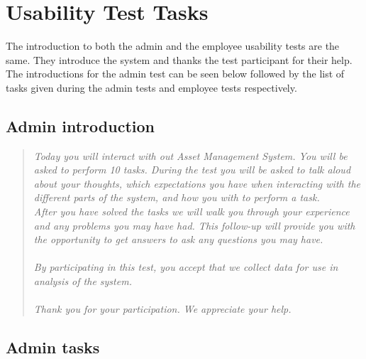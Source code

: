\chapter{Usability Test Tasks} \label{app:usabilityTest}
The introduction to both the admin and the employee usability tests are the same. They introduce the system and thanks the test participant for their help. The introductions for the admin test can be seen below followed by the list of tasks given during the admin tests and employee tests respectively. 

\section*{Admin introduction}

\begin{quote}
    \textit{Today you will interact with out Asset Management System. You will be asked to perform 10 tasks. During the test you will be asked to talk aloud about your thoughts, which expectations you have when interacting with the different parts of the system, and how you with to perform a task.
    \\
    After you have solved the tasks we will walk you through your experience and any problems you may have had. This follow-up will provide you with the opportunity to get answers to ask any questions you may have. 
    \\\\
    By participating in this test, you accept that we collect data for use in analysis of the system.
    \\\\
    Thank you for your participation. We appreciate your help.}
\end{quote}


\section*{Admin tasks}

